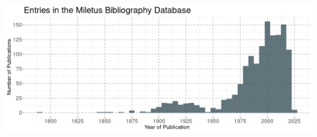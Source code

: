 \documentclass[a4paper,openany]{scrbook}
\begin{document}


\clearpage
\begin{multicols}{2}
    \tableofcontents
\end{multicols}

\clearpage




\vfill
\includegraphics[width=\textwidth]{../out/figures/mil-pubs-by-year.png}


\begin{flushleft}%
\clearpage



 

\end{flushleft}
 
\end{document}
